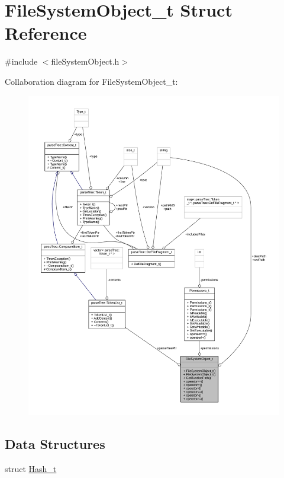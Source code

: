 \hypertarget{struct_file_system_object__t}{}\section{File\+System\+Object\+\_\+t Struct Reference}
\label{struct_file_system_object__t}


{\ttfamily \#include $<$file\+System\+Object.\+h$>$}



Collaboration diagram for File\+System\+Object\+\_\+t\+:
\nopagebreak
\begin{figure}[H]
\begin{center}
\leavevmode
\includegraphics[width=350pt]{struct_file_system_object__t__coll__graph}
\end{center}
\end{figure}
\subsection*{Data Structures}
\begin{DoxyCompactItemize}
\item 
struct \hyperlink{struct_file_system_object__t_1_1_hash__t}{Hash\+\_\+t}
\end{DoxyCompactItemize}
